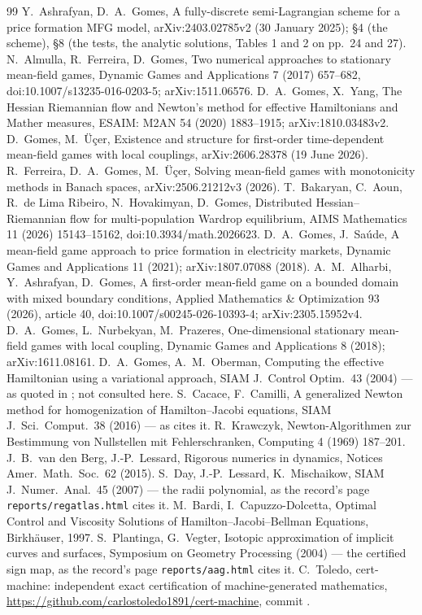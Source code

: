 \documentclass[11pt]{article}
\begin{document}
\footnotesize
\begin{thebibliography}{99}
 Y.~Ashrafyan, D.~A.~Gomes, A fully-discrete semi-Lagrangian scheme for a price formation MFG model, arXiv:2403.02785v2 (30 January 2025); \S4 (the scheme), \S8 (the tests, the analytic solutions, Tables 1 and 2 on pp.~24 and 27).
 N.~Almulla, R.~Ferreira, D.~Gomes, Two numerical approaches to stationary mean-field games, Dynamic Games and Applications 7 (2017) 657--682, doi:10.1007/s13235-016-0203-5; arXiv:1511.06576.
 D.~A.~Gomes, X.~Yang, The Hessian Riemannian flow and Newton's method for effective Hamiltonians and Mather measures, ESAIM: M2AN 54 (2020) 1883--1915; arXiv:1810.03483v2.
 D.~Gomes, M.~\"U\c{c}er, Existence and structure for first-order time-dependent mean-field games with local couplings, arXiv:2606.28378 (19 June 2026).
 R.~Ferreira, D.~A.~Gomes, M.~\"U\c{c}er, Solving mean-field games with monotonicity methods in Banach spaces, arXiv:2506.21212v3 (2026).
 T.~Bakaryan, C.~Aoun, R.~de Lima Ribeiro, N.~Hovakimyan, D.~Gomes, Distributed Hessian--Riemannian flow for multi-population Wardrop equilibrium, AIMS Mathematics 11 (2026) 15143--15162, doi:10.3934/math.2026623.
 D.~A.~Gomes, J.~Sa\'ude, A mean-field game approach to price formation in electricity markets, Dynamic Games and Applications 11 (2021); arXiv:1807.07088 (2018).
 A.~M.~Alharbi, Y.~Ashrafyan, D.~Gomes, A first-order mean-field game on a bounded domain with mixed boundary conditions, Applied Mathematics \& Optimization 93 (2026), article 40, doi:10.1007/s00245-026-10393-4; arXiv:2305.15952v4.
 D.~A.~Gomes, L.~Nurbekyan, M.~Prazeres, One-dimensional stationary mean-field games with local coupling, Dynamic Games and Applications 8 (2018); arXiv:1611.08161.
 D.~A.~Gomes, A.~M.~Oberman, Computing the effective Hamiltonian using a variational approach, SIAM J.\ Control Optim.\ 43 (2004) --- as quoted in \cite{GY20}; not consulted here.
 S.~Cacace, F.~Camilli, A generalized Newton method for homogenization of Hamilton--Jacobi equations, SIAM J.\ Sci.\ Comput.\ 38 (2016) --- as \cite{GY20} cites it.
 R.~Krawczyk, Newton-Algorithmen zur Bestimmung von Nullstellen mit Fehlerschranken, Computing 4 (1969) 187--201.
 J.~B.~van den Berg, J.-P.~Lessard, Rigorous numerics in dynamics, Notices Amer.\ Math.\ Soc.\ 62 (2015).
 S.~Day, J.-P.~Lessard, K.~Mischaikow, SIAM J.\ Numer.\ Anal.\ 45 (2007) --- the radii polynomial, as the record's page \texttt{reports/regatlas.html} cites it.
 M.~Bardi, I.~Capuzzo-Dolcetta, Optimal Control and Viscosity Solutions of Hamilton--Jacobi--Bellman Equations, Birkh\"auser, 1997.
 S.~Plantinga, G.~Vegter, Isotopic approximation of implicit curves and surfaces, Symposium on Geometry Processing (2004) --- the certified sign map, as the record's page \texttt{reports/aag.html} cites it.
 C.~Toledo, cert-machine: independent exact certification of machine-generated mathematics, \url{https://github.com/carlostoledo1891/cert-machine}, commit \RepoCommit.
\end{thebibliography}
\end{document}
